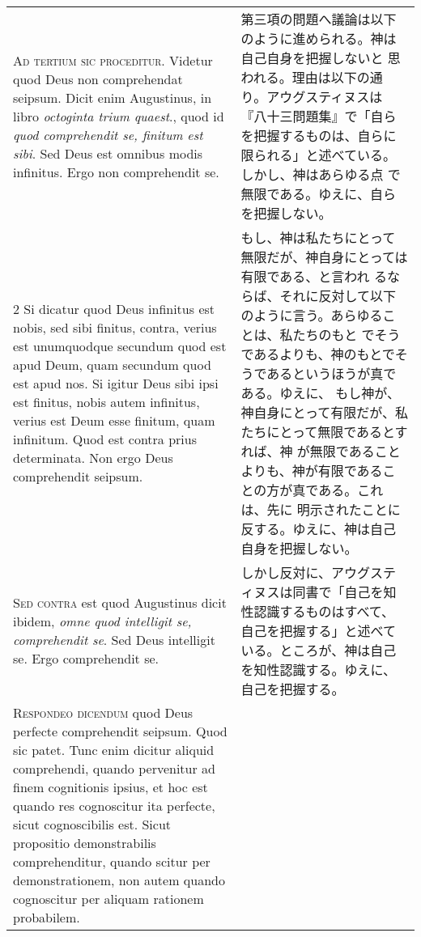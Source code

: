 \documentclass[10pt]{jsarticle} %
\begin{document}
\begin{longtable}{p{21em}p{21em}}
{\huge A}{\scshape d tertium sic proceditur}. Videtur quod Deus non
comprehendat seipsum. Dicit enim Augustinus, in libro {\itshape
octoginta trium quaest}., quod id {\itshape quod comprehendit se,
finitum est sibi}. Sed Deus est omnibus modis infinitus. Ergo non
comprehendit se.

&

第三項の問題へ議論は以下のように進められる。神は自己自身を把握しないと
思われる。理由は以下の通り。アウグスティヌスは『八十三問題集』で「自ら
を把握するものは、自らに限られる」と述べている。しかし、神はあらゆる点
で無限である。ゆえに、自らを把握しない。

\\


2 Si dicatur quod Deus infinitus est nobis, sed sibi finitus, contra,
verius est unumquodque secundum quod est apud Deum, quam secundum quod
est apud nos. Si igitur Deus sibi ipsi est finitus, nobis autem
infinitus, verius est Deum esse finitum, quam infinitum. Quod est
contra prius determinata. Non ergo Deus comprehendit seipsum.


&

もし、神は私たちにとって無限だが、神自身にとっては有限である、と言われ
るならば、それに反対して以下のように言う。あらゆることは、私たちのもと
でそうであるよりも、神のもとでそうであるというほうが真である。ゆえに、
もし神が、神自身にとって有限だが、私たちにとって無限であるとすれば、神
が無限であることよりも、神が有限であることの方が真である。これは、先に
明示されたことに反する。ゆえに、神は自己自身を把握しない。


\\


{\scshape Sed contra} est quod Augustinus dicit ibidem, {\itshape omne
quod intelligit se, comprehendit se}. Sed Deus intelligit se. Ergo
comprehendit se.

&

しかし反対に、アウグスティヌスは同書で「自己を知性認識するものはすべて、
自己を把握する」と述べている。ところが、神は自己を知性認識する。ゆえに、
自己を把握する。


\\


{\scshape Respondeo dicendum} quod Deus perfecte comprehendit
seipsum. Quod sic patet. Tunc enim dicitur aliquid comprehendi, quando
pervenitur ad finem cognitionis ipsius, et hoc est quando res
cognoscitur ita perfecte, sicut cognoscibilis est. Sicut propositio
demonstrabilis comprehenditur, quando scitur per demonstrationem, non
autem quando cognoscitur per aliquam rationem probabilem.


\end{longtable}
\end{document}
